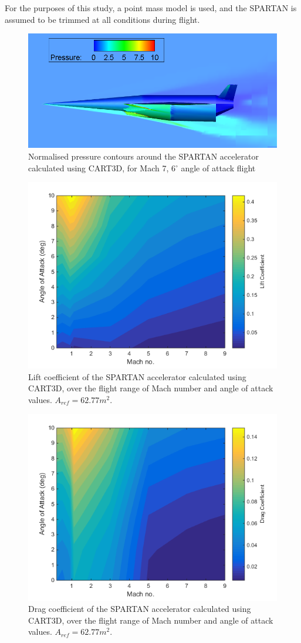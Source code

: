 \documentclass[conf]{new-aiaa}
\begin{document}
 For the purposes of this study, a point mass model is used, and the SPARTAN is assumed to be trimmed at all  conditions during flight.
 
 \begin{figure}
 	\centering
 	\includegraphics[width=0.7\linewidth]{Figures/M7AoA6}
 	\caption{Normalised pressure contours around the SPARTAN accelerator calculated using CART3D, for Mach 7, 6$^\circ$ angle of attack flight}
 	\label{fig:M7AoA6}
 \end{figure}

\begin{figure}
\centering
\includegraphics[width=0.6\linewidth]{Figures/Cl}
\caption{Lift coefficient of the SPARTAN accelerator calculated using CART3D, over the flight range of Mach number and angle of attack values. $A_{ref} = 62.77m^2$.}
\label{fig:Cl}
\end{figure}
\begin{figure}
\centering
\includegraphics[width=0.6\linewidth]{Figures/Cd}
\caption{Drag coefficient of the SPARTAN accelerator calculated using CART3D, over the flight range of Mach number and angle of attack values. $A_{ref} = 62.77m^2$.}
\label{fig:Cd}
\end{figure}
\end{document}
